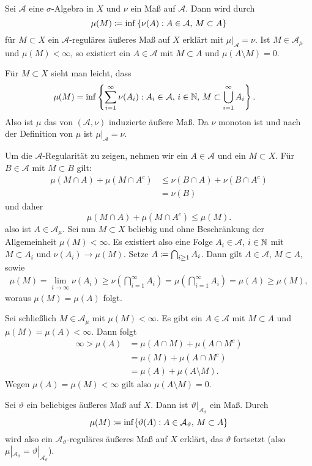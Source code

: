 \documentclass[a4paper,twoside,DIV15,BCOR12mm]{scrbook}
\newcommand{\A}{\mathcal A}
\begin{document}
\begin{satz}\label{satz:1.4}
Sei $\A$ eine $\sigma$-Algebra in $X$ und $\nu$ ein Maß auf $\A$. Dann wird durch
\[
\mu(M) \da \inf\left\{\nu(A) : A\in\A,\, M\subset A\right\}
\]
für $M\subset X$ ein $\A$-reguläres äußeres Maß auf $X$ erklärt mit $\mu|_{\A} = \nu$. Ist $M\in\A_\mu$ und $\mu(M)<\infty$, so existiert ein $A\in\A$ mit $M\subset A$ und $\mu(A\setminus M) = 0$.
\end{satz}

\begin{beweis}
Für $M\subset X$ sieht man leicht, dass
\begin{align*}
\mu(M) &= \inf\left\{\sum_{i=1}^\infty \nu(A_i) : A_i \in \A,\, i\in \MdN,\, M\subset \bigcup_{i=1}^\infty A_i\right\}.
\end{align*}
Also ist $\mu$ das von $(\A,\nu)$ induzierte äußere Maß. Da $\nu$ monoton ist und nach der Definition von $\mu$ ist $\mu|_\A = \nu$.

Um die $\A$-Regularität zu zeigen, nehmen wir ein $A\in\A$ und ein $M\subset X$. Für $B\in\A$ mit $M\subset B$ gilt:
\begin{align*}
\mu(M\cap A) + \mu(M\cap A^c) 
&\le \nu(B\cap A) + \nu(B\cap A^c) \\
&= \nu(B)
\end{align*}
und daher
\[
\mu(M\cap A) + \mu(M\cap A^c) \le \mu(M).
\]
also ist $A\in\A_\mu$. Sei nun $M\subset X$ beliebig und ohne Beschränkung der Allgemeinheit $\mu(M)<\infty$. Es existiert also eine Folge $A_i\in\A$, $i\in\mathbb{N}$ mit $M\subset A_i$ und $\nu(A_i) \to \mu(M)$. Setze $A\da \bigcap_{i\ge 1} A_i$. Dann gilt $A \in \A$, $M\subset A$, sowie
\begin{align*}
\mu(M) = \lim_{i\to\infty} \nu(A_i) \ge \nu(\bigcap_{i=1}^\infty A_i) = \mu(\bigcap _{i=1}^\infty A_i) = \mu(A) \ge \mu(M),
\end{align*}
woraus $\mu(M) = \mu(A)$ folgt.

Sei schließlich $M\in\A_\mu$ mit $\mu(M)<\infty$. Es gibt ein $A\in\A$ mit $M\subset A$ und $\mu(M) = \mu(A)<\infty$. Dann folgt
\begin{align*}
\infty > \mu(A) &= \mu(A\cap M) +\mu(A\cap M^c) \\
&= \mu(M) + \mu(A\cap M^c) \\
&= \mu(A) + \mu(A\setminus M).
\end{align*}
Wegen $\mu(A)=\mu(M)<\infty$ gilt also $\mu(A\setminus M) =0$.
\end{beweis}


\begin{anwendung}
Sei $\vartheta$ ein beliebiges äußeres Maß auf $X$. Dann ist $\vartheta|_{\A_\vartheta}$ ein Maß. Durch
\[
\mu(M) \da \inf\{\vartheta(A) : A\in\A_\vartheta,\, M\subset A\}
\]
wird also ein $\A_\vartheta$-reguläres äußeres Maß auf $X$ erklärt, das $\vartheta$ fortsetzt (also $\mu|_{\A_\vartheta} = \vartheta|_{\A_\vartheta}$).
\end{anwendung}
\end{document}
